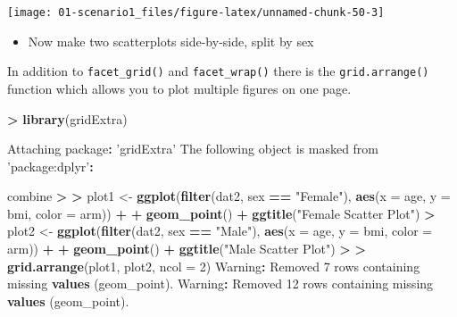 \documentclass[
]{book}
\newenvironment{Shaded}{\begin{snugshade}}{\end{snugshade}}
\newcommand{\DataTypeTok}[1]{\textcolor[rgb]{0.13,0.29,0.53}{#1}}
\newcommand{\DecValTok}[1]{\textcolor[rgb]{0.00,0.00,0.81}{#1}}
\newcommand{\ErrorTok}[1]{\textcolor[rgb]{0.64,0.00,0.00}{\textbf{#1}}}
\newcommand{\KeywordTok}[1]{\textcolor[rgb]{0.13,0.29,0.53}{\textbf{#1}}}
\newcommand{\NormalTok}[1]{#1}
\newcommand{\OperatorTok}[1]{\textcolor[rgb]{0.81,0.36,0.00}{\textbf{#1}}}
\newcommand{\StringTok}[1]{\textcolor[rgb]{0.31,0.60,0.02}{#1}}
\providecommand{\tightlist}{%
  \setlength{\itemsep}{0pt}\setlength{\parskip}{0pt}}
\begin{document}
\begin{center}\texttt{[image: 01-scenario1\_files/figure-latex/unnamed-chunk-50-3]} \end{center}

\begin{itemize}
\tightlist
\item
  Now make two scatterplots side-by-side, split by sex
\end{itemize}

In addition to \texttt{facet\_grid()} and \texttt{facet\_wrap()} there is the \texttt{grid.arrange()} function which allows you to plot multiple figures on one page.

\begin{Shaded}
\begin{Highlighting}[]
\OperatorTok{>}\StringTok{ }\KeywordTok{library}\NormalTok{(gridExtra)}

\NormalTok{Attaching package}\OperatorTok{:}\StringTok{ 'gridExtra'}
\NormalTok{The following object is masked from }\StringTok{'package:dplyr'}\OperatorTok{:}

\StringTok{    }\NormalTok{combine}
\OperatorTok{>}\StringTok{ }
\ErrorTok{>}\StringTok{ }\NormalTok{plot1 <-}\StringTok{ }\KeywordTok{ggplot}\NormalTok{(}\KeywordTok{filter}\NormalTok{(dat2, sex }\OperatorTok{==}\StringTok{ "Female"}\NormalTok{), }\KeywordTok{aes}\NormalTok{(}\DataTypeTok{x =}\NormalTok{ age, }\DataTypeTok{y =}\NormalTok{ bmi, }\DataTypeTok{color =}\NormalTok{ arm)) }\OperatorTok{+}\StringTok{ }
\OperatorTok{+}\StringTok{     }\KeywordTok{geom_point}\NormalTok{() }\OperatorTok{+}\StringTok{ }\KeywordTok{ggtitle}\NormalTok{(}\StringTok{"Female Scatter Plot"}\NormalTok{)}
\OperatorTok{>}\StringTok{ }\NormalTok{plot2 <-}\StringTok{ }\KeywordTok{ggplot}\NormalTok{(}\KeywordTok{filter}\NormalTok{(dat2, sex }\OperatorTok{==}\StringTok{ "Male"}\NormalTok{), }\KeywordTok{aes}\NormalTok{(}\DataTypeTok{x =}\NormalTok{ age, }\DataTypeTok{y =}\NormalTok{ bmi, }\DataTypeTok{color =}\NormalTok{ arm)) }\OperatorTok{+}\StringTok{ }
\OperatorTok{+}\StringTok{     }\KeywordTok{geom_point}\NormalTok{() }\OperatorTok{+}\StringTok{ }\KeywordTok{ggtitle}\NormalTok{(}\StringTok{"Male Scatter Plot"}\NormalTok{)}
\OperatorTok{>}\StringTok{ }
\ErrorTok{>}\StringTok{ }\KeywordTok{grid.arrange}\NormalTok{(plot1, plot2, }\DataTypeTok{ncol =} \DecValTok{2}\NormalTok{)}
\NormalTok{Warning}\OperatorTok{:}\StringTok{ }\NormalTok{Removed }\DecValTok{7}\NormalTok{ rows containing missing }\KeywordTok{values}\NormalTok{ (geom_point).}
\NormalTok{Warning}\OperatorTok{:}\StringTok{ }\NormalTok{Removed }\DecValTok{12}\NormalTok{ rows containing missing }\KeywordTok{values}\NormalTok{ (geom_point).}
\end{Highlighting}
\end{Shaded}
\end{document}
